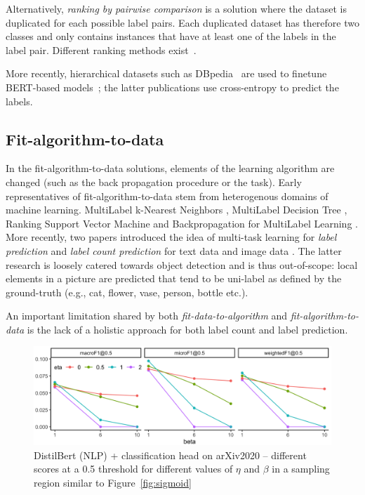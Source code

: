 Alternatively, \textit{ranking by pairwise comparison} is a solution where the dataset is duplicated for each possible label pairs. Each duplicated dataset has therefore two classes and only contains instances that have at least one of the labels in the label pair. Different ranking methods exist~\cite{pairwiseBinary, pairwiseNet}.

More recently, hierarchical datasets such as DBpedia~\citep{lehmann2015dbpedia} are used to finetune BERT-based models~\cite{XLNet, bigBird};  the latter publications use cross-entropy to predict the labels.

\subsection{Fit-algorithm-to-data}
In the fit-algorithm-to-data solutions, elements of the learning
algorithm are changed (such as the back propagation procedure or the task).
Early representatives of fit-algorithm-to-data stem from heterogenous domains
of machine learning. MultiLabel k-Nearest Neighbors \cite{ML-KNN},
MultiLabel Decision Tree \cite{ML-DT}, Ranking Support Vector Machine
\cite{multilabelSVM} and Backpropagation for MultiLabel Learning
\cite{multilabelBackprop}. More recently, two papers introduced the idea of
multi-task learning for \emph{label prediction} and \emph{label count
prediction} for text data \cite[ML\(_{\text{NET}}\)][]{multitaskLabel} and image
data \cite{multitaskLabelImages, tencent}. The latter research is loosely
catered towards object detection and is thus out-of-scope: local elements in a picture are predicted that tend to be uni-label as defined by the ground-truth (e.g., cat, flower, vase, person, bottle
etc.).

An important limitation shared by both \emph{fit-data-to-algorithm} and \emph{fit-algorithm-to-data} is the lack of a holistic approach for both label count and label prediction.

\begin{figure}[t!]
\centering
\includegraphics[width=.8\linewidth]{./images/betaEtaResized.png}
\vspace{.1\baselineskip}
\caption{\label{fig:betaEta}
DistilBert (NLP) + classification head on arXiv2020 – different scores at a 0.5 threshold for different values of $\eta$ and $\beta$ in a sampling region similar to Figure~\ref{fig:sigmoid}}
\end{figure}

